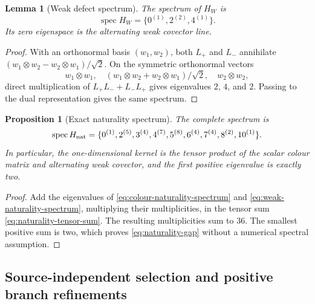 \documentclass[11pt]{article}
\numberwithin{equation}{section}
\newtheorem{proposition}[theorem]{Proposition}
\newtheorem{lemma}[theorem]{Lemma}
\theoremstyle{definition}
\theoremstyle{remark}
\newcommand{\spec}{\operatorname{spec}}
\begin{document}
\begin{lemma}[Weak defect spectrum]
\label{lem:weak-naturality-spectrum}
The spectrum of $H_W$ is
\begin{equation}
 \spec H_W=\{0^{(1)},2^{(2)},4^{(1)}\}.
 \label{eq:weak-naturality-spectrum}
\end{equation}
Its zero eigenspace is the alternating weak covector line.
\end{lemma}

\begin{proof}
With an orthonormal basis $(w_1,w_2)$, both $L_+$ and $L_-$ annihilate
$(w_1\otimes w_2-w_2\otimes w_1)/\sqrt2$.
On the symmetric orthonormal vectors
\[
 w_1\otimes w_1,\quad
 (w_1\otimes w_2+w_2\otimes w_1)/\sqrt2,\quad
 w_2\otimes w_2,
\]
direct multiplication of $L_+L_-+L_-L_+$ gives eigenvalues $2$, $4$, and
$2$.  Passing to the dual representation gives the same spectrum.
\end{proof}

\begin{proposition}[Exact naturality spectrum]
\label{prop:exact-naturality-spectrum}
The complete spectrum is
\begin{equation}
 \spec H_{\rm nat}
 =\{0^{(1)},2^{(5)},3^{(4)},4^{(7)},5^{(8)},
       6^{(4)},7^{(4)},8^{(2)},10^{(1)}\}.
 \label{eq:exact-naturality-spectrum}
\end{equation}
In particular, the one-dimensional kernel is the tensor product of the
scalar colour matrix and alternating weak covector, and the first positive
eigenvalue is exactly two.
\end{proposition}

\begin{proof}
Add the eigenvalues of \eqref{eq:colour-naturality-spectrum} and
\eqref{eq:weak-naturality-spectrum}, multiplying their multiplicities, in
the tensor sum \eqref{eq:naturality-tensor-sum}.  The resulting multiplicities
sum to $36$.  The smallest positive sum is two, which proves
\eqref{eq:naturality-gap} without a numerical spectral assumption.
\end{proof}


\subsection{Source-independent selection and positive branch refinements}
\end{document}
